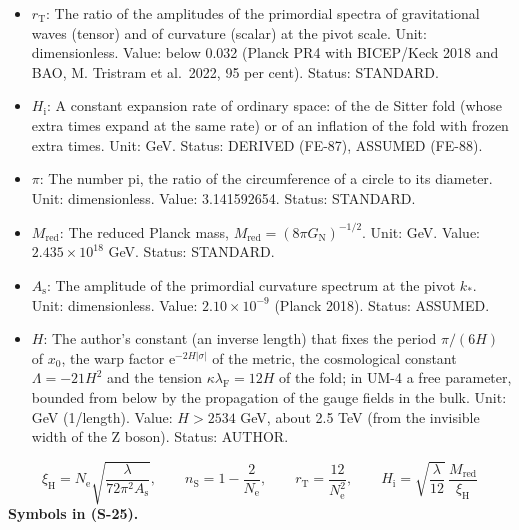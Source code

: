 \documentclass[
  10pt,
]{article}
\providecommand{\tightlist}{%
  \setlength{\itemsep}{0pt}\setlength{\parskip}{0pt}}
\begin{document}
\begin{itemize}
\tightlist
\item
  \(r_{\mathrm{T}}\): The ratio of the amplitudes of the primordial
  spectra of gravitational waves (tensor) and of curvature (scalar) at
  the pivot scale. Unit: dimensionless. Value: below 0.032 (Planck PR4
  with BICEP/Keck 2018 and BAO, M. Tristram et al.~2022, 95 per cent).
  Status: STANDARD.
\item
  \(H_{\mathrm{i}}\): A constant expansion rate of ordinary space: of
  the de Sitter fold (whose extra times expand at the same rate) or of
  an inflation of the fold with frozen extra times. Unit: GeV. Status:
  DERIVED (FE-87), ASSUMED (FE-88).
\item
  \(\pi\): The number pi, the ratio of the circumference of a circle to
  its diameter. Unit: dimensionless. Value: 3.141592654. Status:
  STANDARD.
\item
  \(M_{\mathrm{red}}\): The reduced Planck mass,
  \(M_{\mathrm{red}} = (8\pi G_{\mathrm{N}})^{-1/2}\). Unit: GeV. Value:
  \(2.435\times10^{18}\) GeV. Status: STANDARD.
\item
  \(A_{\mathrm{s}}\): The amplitude of the primordial curvature spectrum
  at the pivot \(k_*\). Unit: dimensionless. Value:
  \(2.10\times10^{-9}\) (Planck 2018). Status: ASSUMED.
\item
  \(H\): The author's constant (an inverse length) that fixes the period
  \(\pi/(6H)\) of \(x_0\), the warp factor
  \(\mathrm{e}^{-2H\lvert\sigma\rvert}\) of the metric, the cosmological
  constant \(\Lambda = -21H^2\) and the tension
  \(\kappa\lambda_{\mathrm{F}} = 12H\) of the fold; in UM-4 a free
  parameter, bounded from below by the propagation of the gauge fields
  in the bulk. Unit: GeV (1/length). Value: \(H > 2534\) GeV, about 2.5
  TeV (from the invisible width of the Z boson). Status: AUTHOR.
\end{itemize}

\[
\xi_{\mathrm{H}} = N_{\mathrm{e}}\sqrt{\frac{\lambda}{72\pi^2A_{\mathrm{s}}}},\qquad n_{\mathrm{S}} = 1 - \frac{2}{N_{\mathrm{e}}},\qquad r_{\mathrm{T}} = \frac{12}{N_{\mathrm{e}}^2},\qquad
H_{\mathrm{i}} = \sqrt{\frac{\lambda}{12}}\,\frac{M_{\mathrm{red}}}{\xi_{\mathrm{H}}} \tag{S-25}
\] \textbf{Symbols in (S-25).}
\end{document}
